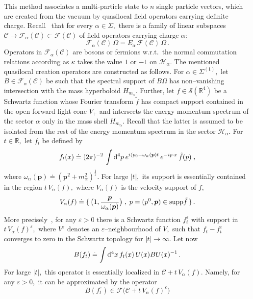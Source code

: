 \documentclass[a4paper,reqno,11pt]{amsart}
\theoremstyle{plain}
\theoremstyle{definition}
\numberwithin{equation}{section}
\newcommand{\Bb}{\mathbb{R}}
\newcommand{\F}{{\mathcal F}}
\newcommand{\calH}{{\mathcal H}}
\newcommand{\calC}{{\mathcal C}}
\newcommand{\calS}{{\mathcal S}}
\newcommand{\half}{{\frac{1}{2}}}
\renewcommand{\d}{{\rm d}}
\newcommand{\bfp}{{\boldsymbol{p}}}
\newcommand{\supp}{{\rm supp}}
\newcommand{\eps}{\varepsilon}
\newcommand{\Sec}{\Sigma} %
\renewcommand{\sec}{\alpha}
\newcommand{\Sece}{\Sec^{(1)}} %
\newcommand{\Hsec}{\calH_{\sec}}
\newcommand{\msec}{{m_{\sec}}}
\newcommand{\cone}{\calC}   %
\begin{document}
This method associates a multi-particle state to $n$ 
single particle 
vectors, which are created from the vacuum by quasilocal field
operators carrying definite charge.  
Recall~\cite{DHRI} that for every $\sec\in\Sec,$
there is a family of linear subspaces $\cone \rightarrow
\F_\sec(\cone)\subset\F(\cone)$ of field 
operators carrying charge $\sec:$ 
\[ \F_\sec(\cone)\,\Omega=E_\sec\,\F(\cone)\,\Omega\,. 
\]
Operators in $\F_\sec(\cone)$ are bosons or fermions  w.r.t.\ the
normal commutation relations ac\-cording as $\kappa$ takes the value $1$ or
 $-1$ on $\Hsec.$  
The mentioned quasilocal creation operators  are constructed as follows. 
For $\sec\in \Sece,$ let $B\in\F_\sec(\cone)$ be such that the spectral 
support of $B\Omega$ has 
non--vanishing intersection with the mass hyperboloid $H_\msec.$ 
Further, let $f\in\calS(\Bb^4)$ be a Schwartz function whose Fourier transform 
$\tilde{f}$ has compact support contained in the open forward light cone $V_+$ 
and intersects the energy momentum spectrum of the sector $\sec$
only in the mass shell $H_\msec.$ 
Recall that the latter is assumed to be isolated from the rest of the
energy momentum spectrum in the sector $\calH_\sec.$ 
For $t\in\Bb,$ let $f_t$ be defined by  
\begin{equation}  \label{eqft}
f_t(x)\doteq (2\pi)^{-2}\,\int\d^4 p \:
e^{i(p_0-\omega_\sec(\bfp) t}\,e^{-ip\cdot x}\,\tilde{f}(p) \;, 
\end{equation}
where $\omega_\sec(\bfp)\doteq(\bfp^2+m_\sec^2)^{\half}.$ For large $|t|,$
its support is essentially contained in the region $t \,V_\sec(f),$
where $V_\sec(f)$ is the velocity support of $f,$ 
\begin{equation}  \label{eqVf}
V_\sec(f)\doteq \{\, \big(1,\frac{\bfp}{\omega_\sec(\bfp)}\big)\;,\;
p=(p^0,\bfp)\in\supp\tilde{f}\,\}\,.   
\end{equation}
More precisely~\cite{BBS,Hepp}, for any $\eps>0$ there is a Schwartz function 
${f}^\eps_t$ with support in $t\,V_\sec(f)^\eps,$ where $V^\eps$
denotes an $\eps$--neighbourhood of $V,$ such that
$f_t-{f}^\eps_t$ converges to zero in the Schwartz topology for 
$|t|\rightarrow\infty.$
Let now 
\begin{equation*} 
 B(f_t)\doteq\int \d^4 x \,f_t(x)\,U(x) B U(x)^{-1} \,.
\end{equation*}
For large $|t|,$ this operator is essentially localized 
in $\cone+t\,V_\sec(f).$ 
Namely, for any $\eps>0,$ it can be approximated by the operator 
\begin{equation} \label{eqBeps}
B(f^\eps_t)\in\F\big(\cone+t\,V_\sec(f)^\eps\big) 
\end{equation}
\end{document}
